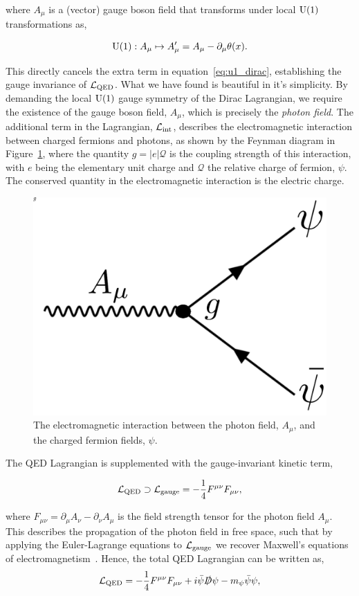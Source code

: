 \noindent
where $A_\mu$ is a (vector) gauge boson field that transforms under local ${\rm{U}}(1)$ transformations as,

\begin{equation}
    {\rm{U}}(1): A_\mu \mapsto A_\mu' = A_\mu - {\partial_\mu\theta(x)}.
\end{equation}

\noindent
This directly cancels the extra term in equation~\ref{eq:u1_dirac}, establishing the gauge invariance of $\mathcal{L}_{\rm{QED}}$. What we have found is beautiful in it's simplicity. By demanding the local ${\rm{U}}(1)$ gauge symmetry of the Dirac Lagrangian, we require the existence of the gauge boson field, $A_\mu$, which is precisely the \textit{photon field}. The additional term in the Lagrangian, $\mathcal{L}_{\rm{int}}$, describes the electromagnetic interaction between charged fermions and photons,
as shown by the Feynman diagram in Figure~\ref{fig:eminteraction}, where the quantity $g=|e|\mathcal{Q}$ is the coupling strength of this interaction, with $e$ being the elementary unit charge and $\mathcal{Q}$ the relative charge of fermion, $\psi$. The conserved quantity in the electromagnetic interaction is the electric charge.

\begin{figure}[htb!]
  \centering
  \includegraphics[width=.25\linewidth]{Figures/theory/em_interaction.pdf}
  \caption[The electromagnetic interaction]
  {
    The electromagnetic interaction between the photon field, $A_\mu$, and the charged fermion fields, $\psi$.
  }
  \label{fig:eminteraction}
\end{figure}

The QED Lagrangian is supplemented with the gauge-invariant kinetic term, 

\begin{equation}
    \mathcal{L}_{\rm{QED}} \supset \mathcal{L}_{\rm{gauge}} = -\frac{1}{4}F^{\mu\nu}F_{\mu\nu},
\end{equation}

\noindent
where $F_{\mu\nu}=\partial_{\mu}A_\nu-\partial_{\nu}A_\mu$ is the field strength tensor for the photon field $A_\mu$. This describes the propagation of the photon field in free space, such that by applying the Euler-Lagrange equations to $\mathcal{L}_{\rm{gauge}}$ we recover Maxwell's equations of electromagnetism~\cite{Aitchison:2003tq}. Hence, the total QED Lagrangian can be written as, 
\begin{equation}
    \mathcal{L}_{\rm{QED}} = -\frac{1}{4}F^{\mu\nu}F_{\mu\nu} + i\bar{\psi}\slashed{D}\psi - m_{\psi}\bar{\psi}\psi,
\end{equation}

